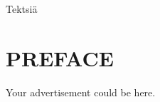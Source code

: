 \noindent
Tektsiä

\newpage
 
\chapter*{PREFACE}
\noindent 

Your advertisement could be here.
 
\newpage
\tableofcontents

%  
%  
%  
 
 
\newpage
\renewcommand{\chaptermark}[1]{\markboth{\thechapter. \ #1}{}}
\renewcommand{\sectionmark}[1]{\markright{}{}}
\lhead{\fancyplain{}{\leftmark}}
 
